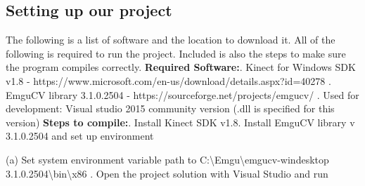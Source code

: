 \documentclass[onecolumn, draftclsnofoot,10pt, compsoc]{IEEEtran}
\begin{document}
\subsection{Setting up our project}
The following is a list of software and the location to download it. All of the following is required to run the project. Included is also the steps to make sure the program compiles correctly.\newline
\textbf{Required Software:}. Kinect for Windows SDK v1.8 - https://www.microsoft.com/en-us/download/details.aspx?id=40278
. EmguCV library 3.1.0.2504 - https://sourceforge.net/projects/emgucv/
. Used for development: Visual studio 2015 community version (.dll is specified for this version)
\newline
\textbf{Steps to compile:}. Install Kinect SDK v1.8. Install EmguCV library v 3.1.0.2504 and set up environment

(a) Set system environment variable path to C:\textbackslash Emgu\textbackslash emgucv-windesktop 3.1.0.2504\textbackslash bin\textbackslash x86
. Open the project solution with Visual Studio and run
\end{document}
